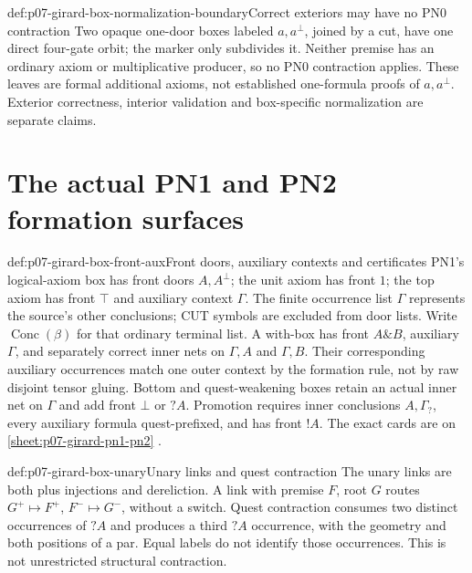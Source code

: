 \begin{hbexample}{def:p07-girard-box-normalization-boundary}{Correct exteriors may have no PN0 contraction}
Two opaque one-door boxes labeled \(a,a^\perp\), joined by a cut,
have one direct four-gate orbit; the marker only subdivides it.
Neither premise has an ordinary axiom or multiplicative producer,
so no PN0 contraction applies. These leaves are formal additional
axioms, not established one-formula proofs of \(a,a^\perp\).
Exterior correctness, interior validation and box-specific normalization
are separate claims.
\end{hbexample}

\section{The actual PN1 and PN2 formation surfaces}
\label{sec:p07-girard-pn1-pn2}

\begin{hbdefinition}{def:p07-girard-box-front-aux}{Front doors, auxiliary contexts and certificates}
PN1's logical-axiom box has front doors \(A,A^\perp\);
the unit axiom has front \(1\); the top axiom has front \(\top\)
and auxiliary context \(\Gamma\).
The finite occurrence list \(\Gamma\) represents the source's other
conclusions; CUT symbols are excluded from door lists.
Write \(\operatorname{Conc}(\beta)\) for that ordinary terminal list.
A with-box has front \(A\mathbin{\&}B\), auxiliary \(\Gamma\),
and separately correct inner nets on \(\Gamma,A\) and \(\Gamma,B\).
Their corresponding auxiliary occurrences match one outer context by
the formation rule, not by raw disjoint tensor gluing.
Bottom and quest-weakening boxes retain an actual inner net on
\(\Gamma\) and add front \(\bot\) or \(?A\).
Promotion requires inner conclusions \(A,\Gamma_?\), every auxiliary
formula quest-prefixed, and has front \(!A\).
The exact cards are on \cref{sheet:p07-girard-pn1-pn2}
\cite[pp.~44--46]{Girard1987AuthorHosted}.
\end{hbdefinition}

\begin{hbdefinition}{def:p07-girard-box-unary}{Unary links and quest contraction}
The unary links are both plus injections and dereliction.
A link with premise \(F\), root \(G\) routes
\(G^+\mapsto F^+\), \(F^-\mapsto G^-\), without a switch.
Quest contraction consumes two distinct occurrences of \(?A\) and
produces a third \(?A\) occurrence, with the geometry and both
positions of a par. Equal labels do not identify those occurrences.
This is not unrestricted structural contraction.
\end{hbdefinition}

